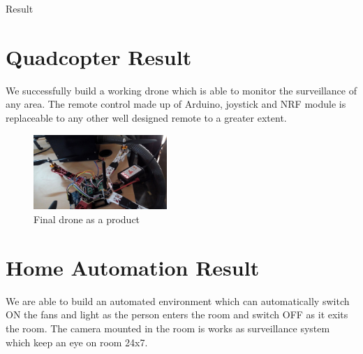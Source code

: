 \documentclass[12pt, oneside]{report}
\numberwithin{equation}{section}
\begin{document}
\begin{chapter}{Result}
\section{Quadcopter Result}
We successfully build a working drone which is able to monitor the surveillance of any area. The remote control made up of Arduino, joystick and NRF module is replaceable to any other well designed remote to a greater extent.\\
\begin{figure}[h]
\center
\includegraphics[width=0.45\textwidth]{final_drone}
\caption{Final drone as a product}
\end{figure}



%

\section{Home Automation Result}
We are able to build an automated environment which can automatically switch ON the fans and light as the person enters the room and switch OFF as it exits the room. The camera mounted in the room is works as surveillance system which keep an eye on room 24x7.

\end{chapter}
\end{document}
